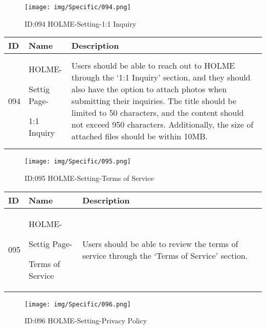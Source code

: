 \documentclass[conference]{IEEEtran}
\begin{document}
\begin{enumerate}
\begin{figure}[h]
\centering                                         
\texttt{[image: img/Specific/094.png]}
\caption{ID:094 HOLME-Setting-1:1 Inquiry}
\end{figure}
\begin{table}[h]
\def\arraystretch{1.2} \small
    \begin{tabular}{|p{1cm}|p{1.8cm}|p{5.0cm}|}
        \hline
        ID & Name & Description\\ \hline
         094 \par  & HOLME-\par Settig Page- \par 1:1 Inquiry& Users should be able to reach out to HOLME through the `1:1 Inquiry' section, and they should also have the option to attach photos when submitting their inquiries. The title should be limited to 50 characters, and the content should not exceed 950 characters. Additionally, the size of attached files should be within 10MB.
         \\ \hline
    \end{tabular}
\end{table}
\begin{figure}[h]
\centering                                         
\texttt{[image: img/Specific/095.png]}
\caption{ID:095 HOLME-Setting-Terms of Service}
\end{figure}
\begin{table}[h]
\def\arraystretch{1.2} \small
    \begin{tabular}{|p{1cm}|p{1.8cm}|p{5.0cm}|}
        \hline
        ID & Name & Description\\ \hline
         095 \par  & HOLME-\par Settig Page- \par Terms of Service& 
       	Users should be able to review the terms of service through the `Terms of Service' section.
         \\ \hline
    \end{tabular}
\end{table}
\begin{figure}[h]
\centering                                         
\texttt{[image: img/Specific/096.png]}
\caption{ID:096 HOLME-Setting-Privacy Policy}
\end{figure}
\begin{table}[h]
\def\arraystretch{1.2} \small
    \begin{tabular}{|p{1cm}|p{1.8cm}|p{5.0cm}|}

\end{tabular}
\end{table}
\end{enumerate}
\end{document}
